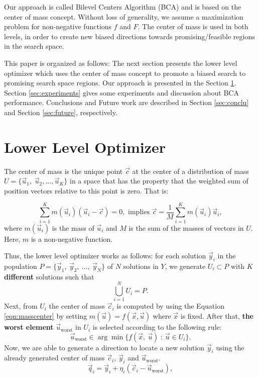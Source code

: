 \documentclass[conference]{IEEEtran}
\begin{document}
Our approach is called Bilevel Centers Algorithm (BCA) and is based on the center
of mass concept. Without loss of generality, we assume a maximization problem for
non-negative functions $f$ and $F$. The center of mass is used in both levels, in
order to create new biased directions towards promising/feasible regions in the
search space.


This paper is organized as follows: The next section presents the lower level
optimizer which uses the center of mass concept to promote a biased search to
promising search space regions. Our approach is presented in the
Section \ref{sec:ll-optimizer}. Section \ref{sec:experiments} gives some experiments
and discussion about BCA performance. Conclusions and Future work are described
in Section \ref{sec:conclu}  and Section \ref{sec:future}, respectively.


\section{Lower Level Optimizer} %
\label{sec:ll-optimizer}

The center of mass is the unique point $\vec{c}$ at the center of a distribution
of mass $U = \{\vec{u}_1,\; \vec{u}_2 , \ldots , \vec{u}_K \}$ in a space that 
has the property that the weighted sum of position vectors relative to this
point is zero. That is:

\begin{equation}
    \sum_{i = 1}^K m(\vec{u}_i) (\vec{u}_i - \vec{c}) = 0,  \text{ implies } 
    \vec{c} = \dfrac{1}{M} \sum_{i = 1}^K  m(\vec{u}_i)  \vec{u}_i,
    \label{eqn:masscenter}
\end{equation}
%
%
where $m(\vec{u}_i)$ is the mass of $\vec{u}_i$ and  $M$ is the sum of the 
masses of vectors in $U$. Here, $m$ is a non-negative function.
 
Thus, the lower level optimizer works as follows: for each solution $\vec{y}_i $
in the population $P = \{ \vec{y}_1,\ \vec{y}_2, \ \ldots, \ \vec{y}_{N} \} $
of $N$  solutions in $Y$, we generate $U_i \subset P $ with $K$ \textbf{different}
solutions such that
% 
$$
\bigcup_{i=1}^N U_i = P.
$$
%
Next, from $U_i$ the center of mass $\vec{c}_i$ is computed by using the
Equation \ref{eqn:masscenter} by setting $m(\vec{u}) = f(\vec{x}, \vec{u})$ where
$\vec{x}$ is fixed. After that, \textbf{the worst element} $\vec{u}_{\text{worst}}$
in $U_i$ is selected according to the following rule:
% 
$$
    \vec{u}_{\text{worst}} \in \arg \min \{f(\vec{x}, \ \vec{u} ) 
    \ : \
    \vec{u} \in U_i \}.
$$
% 
Now, we are able to generate a direction to locate a new solution $ \vec{y}_i$
using the already generated center of mass $\vec{c}_i$, $\vec{y}_i$ and $\vec{u}_{\text{worst}}$.
% 
\begin{equation}
    \vec{q}_i = \vec{y}_i + \eta _{i} ( \vec{c}_i - \vec{u}_{ \text{worst} } ) ,
    \label{eqn:vcu2}
\end{equation}
% 
\end{document}
